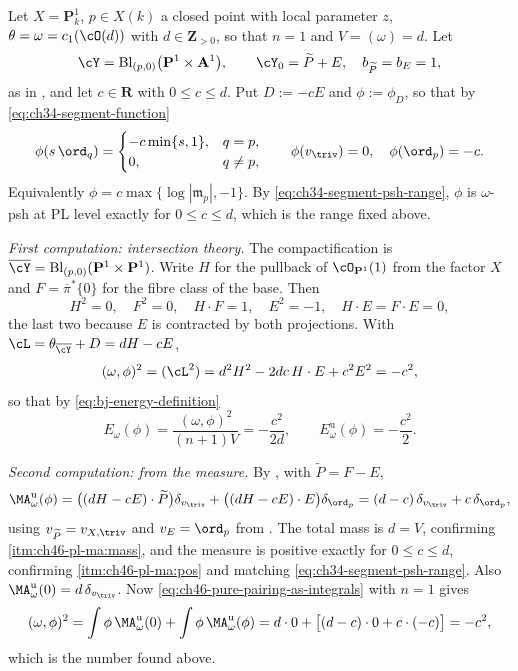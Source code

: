 \begin{example}
\label{ex:ch46-p1-energy}
Let $X=\mathbf P^1_k$, $p\in X(k)$ a closed point with local parameter
$z$, $\theta=\omega=c_1(\cO(d))$ with $d\in\mathbf Z_{>0}$, so that
$n=1$ and $V=(\omega)=d$.  Let
\[
 \cY=\operatorname{Bl}_{(p,0)}\bigl(\mathbf P^1\times\mathbf A^1\bigr),
 \qquad
 \cY_0=\widetilde P+E,\quad b_{\widetilde P}=b_E=1,
\]
as in , and let
$c\in\mathbf R$ with $0\le c\le d$.  Put $D:=-cE$ and
$\phi:=\phi_D$, so that by \eqref{eq:ch34-segment-function}
\[
 \phi(s\,\ord_q)=
 \begin{cases}
  -c\min\{s,1\}, & q=p,\\
  0, & q\ne p,
 \end{cases}
 \qquad
 \phi(v_{\triv})=0,\quad \phi(\ord_p)=-c .
\]
Equivalently $\phi=c\max\{\log|\mathfrak m_p|,-1\}$.  By
\eqref{eq:ch34-segment-psh-range}, $\phi$ is $\omega$-psh at PL level
exactly for $0\le c\le d$, which is the range fixed above.

\emph{First computation: intersection theory.}  The compactification is
$\overline\cY=\operatorname{Bl}_{(p,0)}(\mathbf P^1\times\mathbf P^1)$.
Write $H$ for the pullback of $\cO_{\mathbf P^1}(1)$ from the factor
$X$ and $F=\overline\pi^*\{0\}$ for the fibre class of the base.  Then
\[
 H^2=0,\quad F^2=0,\quad H\cdot F=1,\quad
 E^2=-1,\quad H\cdot E=F\cdot E=0,
\]
the last two because $E$ is contracted by both projections.  With
$\cL=\theta_{\overline\cY}+D=dH-cE$,
\[
 (\omega,\phi)^2=(\cL^2)=d^2H^2-2dc\,H\cdot E+c^2E^2=-c^2,
\]
so that by \eqref{eq:bj-energy-definition}
\[
 E_\omega(\phi)=\frac{(\omega,\phi)^2}{(n+1)V}=-\frac{c^2}{2d},
 \qquad
 E^{\mathrm u}_\omega(\phi)=-\frac{c^2}{2}.
\]

\emph{Second computation: from the measure.}  By
, with $\widetilde P=F-E$,
\[
 \MA^{\mathrm u}_\omega(\phi)
 =\bigl((dH-cE)\cdot\widetilde P\bigr)\delta_{v_{\triv}}
  +\bigl((dH-cE)\cdot E\bigr)\delta_{\ord_p}
 =(d-c)\,\delta_{v_{\triv}}+c\,\delta_{\ord_p},
\]
using $v_{\widetilde P}=v_{X,\triv}$ and $v_E=\ord_p$ from
.  The total mass is $d=V$, confirming
\,\cref{itm:ch46-pl-ma:mass}, and the measure is
positive exactly for $0\le c\le d$, confirming
\cref{itm:ch46-pl-ma:pos} and matching
\eqref{eq:ch34-segment-psh-range}.  Also
$\MA^{\mathrm u}_\omega(0)=d\,\delta_{v_{\triv}}$.  Now
\eqref{eq:ch46-pure-pairing-as-integrals} with $n=1$ gives
\[
 (\omega,\phi)^2
 =\int\phi\,\MA^{\mathrm u}_\omega(0)+\int\phi\,\MA^{\mathrm u}_\omega(\phi)
 =d\cdot0+\bigl[(d-c)\cdot0+c\cdot(-c)\bigr]
 =-c^2 ,
\]
which is the number found above.


\end{example}
